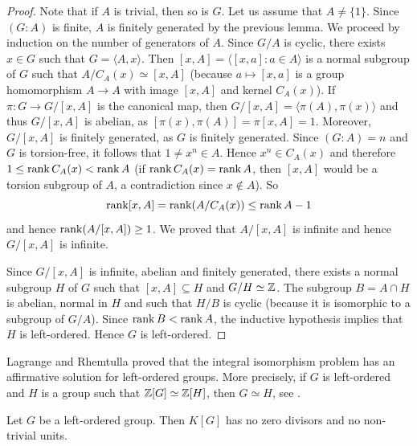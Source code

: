 \begin{graybox}
\begin{proof}
	Note that if $A$ is trivial, then so is $G$. Let us assume that $A\ne\{1\}$. 
    Since $(G:A)$ is finite, $A$ is finitely generated by the previous lemma. 
    We proceed by induction on the number of generators of $A$. Since 
    $G/A$ is cyclic, there exists $x\in G$ such that $G=\langle A,x\rangle$. Then
    $[x,A]=\langle [x,a]:a\in A\rangle$ is a normal subgroup of $G$ such that 
    $A/C_A(x)\simeq [x,A]$ (because $a\mapsto [x,a]$ is a group homomorphism $A\to A$
    with image $[x,A]$ and kernel $C_A(x)$). If $\pi\colon G\to G/[x,A]$ is the canonical map, then
    $G/[x,A]=\langle \pi(A),\pi(x)\rangle$ and thus $G/[x,A]$ is abelian, as 
    $[\pi(x),\pi(A)]=\pi[x,A]=1$. Moreover, $G/[x,A]$ is finitely generated, as $G$
    is finitely generated. Since $(G:A)=n$ and $G$ is torsion-free, it follows that 
    $1\ne x^n\in A$. Hence $x^n\in C_A(x)$ and therefore $1\leq \operatorname{rank} C_A(x)<\operatorname{rank} A$ (if $\operatorname{rank}
    C_A(x)=\operatorname{rank} A$, then $[x,A]$ would be a torsion subgroup of $A$, a contradiction
    since $x\not\in A$). So 
    \[
    \operatorname{rank}[x,A]=\operatorname{rank} (A/C_A(x))\leq\operatorname{rank} A-1
    \]
    and hence $\operatorname{rank} (A/[x,A])\geq 1$. We proved that $A/[x,A]$ is infinite and hence 
    $G/[x,A]$ is infinite. 

    Since $G/[x,A]$ is infinite, abelian and finitely generated, there exists a normal subgroup
    $H$ of $G$ such that $[x,A]\subseteq H$ and $G/H\simeq\mathbb{Z}$. The subgroup 
    $B=A\cap H$ is abelian, normal in $H$ and such that $H/B$ is cyclic
    (because it is isomorphic to a subgroup of $G/A$). Since $\operatorname{rank} B<\operatorname{rank} A$, the inductive hypothesis implies that $H$ is left-ordered. Hence $G$ is left-ordered. 
\end{proof}

Lagrange and Rhemtulla proved that the integral isomorphism problem 
has an affirmative solution for left-ordered groups. More precisely,
if $G$ is left-ordered and $H$ is a group such that $\mathbb{Z}[G]\simeq\mathbb{Z}[H]$, then
$G\simeq H$, see \cite{MR240183}.

\begin{theorem}
	Let $G$ be a left-ordered group. Then $K[G]$ has no zero divisors 
	and no non-trivial units. 
\end{theorem}


\end{graybox}
